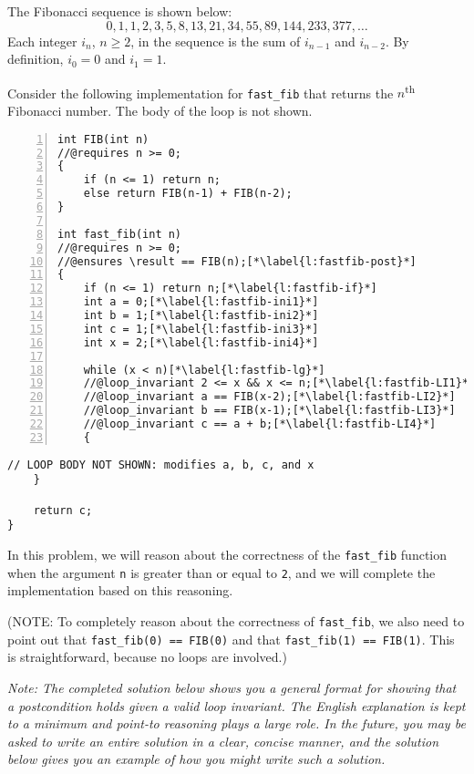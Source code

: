 \clearpage
{}

The Fibonacci sequence is shown below:
$$
0, 1, 1, 2, 3, 5, 8, 13, 21, 34, 55, 89, 144, 233, 377, \ldots
$$
Each integer $i_n$, $n \geq 2$, in the sequence is the sum of
$i_{n-1}$ and $i_{n-2}$. By definition, $i_0 = 0$ and $i_1 = 1$.

Consider the following implementation for \lstinline'fast_fib' that returns
the $n$\textsuperscript{th} Fibonacci number. The body of the
loop is not shown.
\begin{lstlisting}[numbers=left, belowskip=0pt]
int FIB(int n)
//@requires n >= 0;
{
    if (n <= 1) return n;
    else return FIB(n-1) + FIB(n-2);
}

int fast_fib(int n)
//@requires n >= 0;
//@ensures \result == FIB(n);[*\label{l:fastfib-post}*]
{
    if (n <= 1) return n;[*\label{l:fastfib-if}*]
    int a = 0;[*\label{l:fastfib-ini1}*]
    int b = 1;[*\label{l:fastfib-ini2}*]
    int c = 1;[*\label{l:fastfib-ini3}*]
    int x = 2;[*\label{l:fastfib-ini4}*]

    while (x < n)[*\label{l:fastfib-lg}*]
    //@loop_invariant 2 <= x && x <= n;[*\label{l:fastfib-LI1}*]
    //@loop_invariant a == FIB(x-2);[*\label{l:fastfib-LI2}*]
    //@loop_invariant b == FIB(x-1);[*\label{l:fastfib-LI3}*]
    //@loop_invariant c == a + b;[*\label{l:fastfib-LI4}*]
    {
\end{lstlisting}
\begin{lstlisting}[numbers=none,aboveskip=-0pt]
       // LOOP BODY NOT SHOWN: modifies a, b, c, and x
    }

    return c;
}
\end{lstlisting}

In this problem, we will reason about the correctness of the
\lstinline'fast_fib' function when the argument \lstinline'n' is greater than or
equal to \lstinline'2', and we will complete the implementation based on
this reasoning.

(NOTE: To completely reason about the correctness of
\lstinline'fast_fib', we also need to point out that
\lstinline'fast_fib(0) == FIB(0)' and that %
\lstinline'fast_fib(1) == FIB(1)'. This is straightforward, because no
loops are involved.)

\newpage
\emph{Note: The completed solution below shows you a general format for showing
  that a postcondition holds given a valid loop invariant. The English
  explanation is kept to a minimum and point-to reasoning
  plays a large role.  In the future, you may be asked to write an
  entire solution in a clear, concise manner, and the solution below gives
  you an example of how you might write such a solution.}

